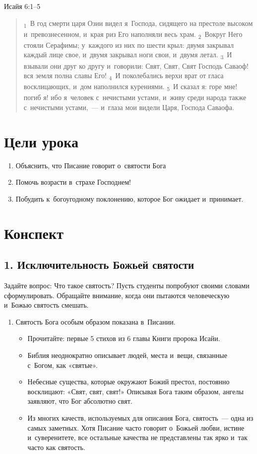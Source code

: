 \documentclass[a4paper,12pt]{article}
\begin{document}
\noindent Исайя 6:1--5

\begin{quote}
\textsubscript{1}~В год смерти царя Озии видел я~Господа, сидящего на престоле высоком и~превознесенном, и~края риз Его наполняли весь храм. 
\textsubscript{2}~Вокруг Него стояли Серафимы; у~каждого из них по шести крыл: двумя закрывал каждый лице свое, и~двумя закрывал ноги свои, и~двумя летал. 
\textsubscript{3}~И взывали они друг ко другу и~говорили: Свят, Свят, Свят Господь Саваоф! вся земля полна славы Его! 
\textsubscript{4}~И поколебались верхи врат от гласа восклицающих, и~дом наполнился курениями. 
\textsubscript{5}~И сказал я: горе мне! погиб я! ибо я~человек с~нечистыми устами, и~живу среди народа также с~нечистыми устами,~--- и~глаза мои видели Царя, Господа Саваофа. 
\end{quote}

\section*{Цели урока}
\begin{enumerate}
    \item Объяснить, что Писание говорит о~святости Бога
    \item  Помочь возрасти в~страхе Господнем!
    \item  Побудить к~богоугодному поклонению, которое Бог ожидает и~принимает.
\end{enumerate}

\section*{Конспект}

\subsection{1. Исключительность Божьей святости}

Задайте вопрос: Что такое святость? Пусть студенты попробуют своими словами сформулировать. Обращайте внимание, когда они пытаются человеческую и~Божью святость смешать.

\begin{enumerate}
    \item Святость Бога особым образом показана в~Писании.
    \begin{itemize}
        \item Прочитайте: первые 5 стихов из 6 главы Книги пророка Исайи.
        \item Библия неоднократно описывает людей, места и~вещи, связанные с~Богом, как «святые».
        \item Небесные существа, которые окружают Божий престол, постоянно восклицают: «Свят, свят, свят!» Описывая Бога таким образом, ангелы заявляют, что Бог абсолютно свят. 
        \item Из многих качеств, используемых для описания Бога, святость~--- одна из самых заметных. Хотя Писание часто говорит о~Божьей любви, истине и~суверенитете, все остальные качества не представлены так ярко и~так часто как святость.
    \end{itemize}
\end{enumerate}
        
\end{document}
